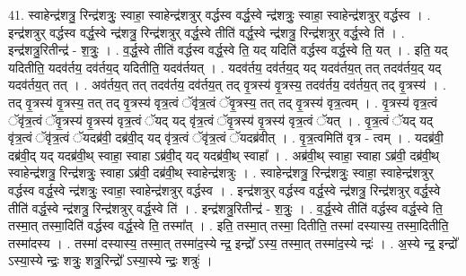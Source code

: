 \documentclass[17pt]{extarticle}
\begin{document}
41. स्वाहेन्द्र॑शत्रु॒ रिन्द्र॑शत्रुः॒ स्वाहा॒ स्वाहेन्द्र॑शत्रुर् वर्द्धस्व वर्द्ध॒स्वे न्द्र॑शत्रुः॒ स्वाहा॒ स्वाहेन्द्र॑शत्रुर् वर्द्धस्व । . इन्द्र॑शत्रुर् वर्द्धस्व वर्द्ध॒स्वे न्द्र॑शत्रु॒ रिन्द्र॑शत्रुर् वर्द्ध॒स्वे तीति॑ वर्द्ध॒स्वे न्द्र॑शत्रु॒ रिन्द्र॑शत्रुर् वर्द्ध॒स्वे ति॑ । . इन्द्र॑शत्रु॒रितीन्द्र॑ - श॒त्रुः॒ । . व॒र्द्ध॒स्वे तीति॑ वर्द्धस्व वर्द्ध॒स्वे ति॒ यद् यदिति॑ वर्द्धस्व वर्द्ध॒स्वे ति॒ यत् । . इति॒ यद् यदितीति॒ यदव॑र्तय॒ दव॑र्तय॒द् यदितीति॒ यदव॑र्तयत् । . यदव॑र्तय॒ दव॑र्तय॒द् यद् यदव॑र्तय॒त् तत् तदव॑र्तय॒द् यद् यदव॑र्तय॒त् तत् । . अव॑र्तय॒त् तत् तदव॑र्तय॒ दव॑र्तय॒त् तद् वृ॒त्रस्य॑ वृ॒त्रस्य॒ तदव॑र्तय॒ दव॑र्तय॒त् तद् वृ॒त्रस्य॑ । . तद् वृ॒त्रस्य॑ वृ॒त्रस्य॒ तत् तद् वृ॒त्रस्य॑ वृत्र॒त्वं ॅवृ॑त्र॒त्वं ॅवृ॒त्रस्य॒ तत् तद् वृ॒त्रस्य॑ वृत्र॒त्वम् । . वृ॒त्रस्य॑ वृत्र॒त्वं ॅवृ॑त्र॒त्वं ॅवृ॒त्रस्य॑ वृ॒त्रस्य॑ वृत्र॒त्वं ॅयद् यद् वृ॑त्र॒त्वं ॅवृ॒त्रस्य॑ वृ॒त्रस्य॑ वृत्र॒त्वं ॅयत् । . वृ॒त्र॒त्वं ॅयद् यद् वृ॑त्र॒त्वं ॅवृ॑त्र॒त्वं ॅयदब्र॑वी॒ दब्र॑वी॒द् यद् वृ॑त्र॒त्वं ॅवृ॑त्र॒त्वं ॅयदब्र॑वीत् । . वृ॒त्र॒त्वमिति॑ वृत्र - त्वम् । . यदब्र॑वी॒ दब्र॑वी॒द् यद् यदब्र॑वी॒थ् स्वाहा॒ स्वाहा ऽब्र॑वी॒द् यद् यदब्र॑वी॒थ् स्वाहा᳚ । . अब्र॑वी॒थ् स्वाहा॒ स्वाहा ऽब्र॑वी॒ दब्र॑वी॒थ् स्वाहेन्द्र॑शत्रु॒ रिन्द्र॑शत्रुः॒ स्वाहा ऽब्र॑वी॒ दब्र॑वी॒थ् स्वाहेन्द्र॑शत्रुः । . स्वाहेन्द्र॑शत्रु॒ रिन्द्र॑शत्रुः॒ स्वाहा॒ स्वाहेन्द्र॑शत्रुर् वर्द्धस्व वर्द्ध॒स्वे न्द्र॑शत्रुः॒ स्वाहा॒ स्वाहेन्द्र॑शत्रुर् वर्द्धस्व । . इन्द्र॑शत्रुर् वर्द्धस्व वर्द्ध॒स्वे न्द्र॑शत्रु॒ रिन्द्र॑शत्रुर् वर्द्ध॒स्वे तीति॑ वर्द्ध॒स्वे न्द्र॑शत्रु॒ रिन्द्र॑शत्रुर् वर्द्ध॒स्वे ति॑ । . इन्द्र॑शत्रु॒रितीन्द्र॑ - श॒त्रुः॒ । . व॒र्द्ध॒स्वे तीति॑ वर्द्धस्व वर्द्ध॒स्वे ति॒ तस्मा॒त् तस्मा॒दिति॑ वर्द्धस्व वर्द्ध॒स्वे ति॒ तस्मा᳚त् । . इति॒ तस्मा॒त् तस्मा॒ दितीति॒ तस्मा॑ दस्यास्य॒ तस्मा॒दितीति॒ तस्मा॑दस्य । . तस्मा॑ दस्यास्य॒ तस्मा॒त् तस्मा॑द॒स्ये न्द्र॒ इन्द्रो᳚ ऽस्य॒ तस्मा॒त् तस्मा॑द॒स्ये न्द्रः॑ । . अ॒स्ये न्द्र॒ इन्द्रो᳚ ऽस्या॒स्ये न्द्रः॒ शत्रुः॒ शत्रु॒रिन्द्रो᳚ ऽस्या॒स्ये न्द्रः॒ शत्रुः॑ । \newline
\pagebreak
{}
\end{document}
